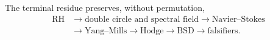 The terminal residue preserves, without permutation,
\[
\begin{aligned}
 \mathrm{RH}
 &\longrightarrow \text{double circle and spectral field}
 \longrightarrow \mathrm{Navier\text{--}Stokes}\\
 &\longrightarrow \mathrm{Yang\text{--}Mills}
 \longrightarrow \mathrm{Hodge}
 \longrightarrow \mathrm{BSD}
 \longrightarrow \text{falsifiers}.
\end{aligned}
\]
